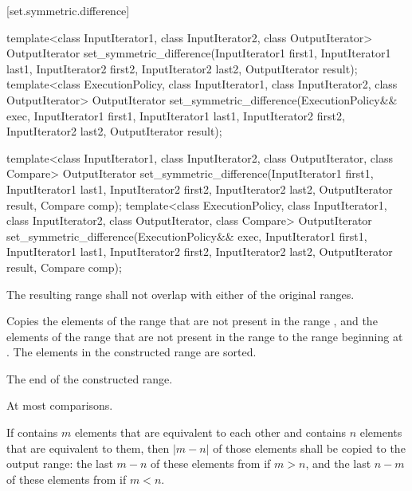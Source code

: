 [set.symmetric.difference]{}

%
\begin{itemdecl}
template<class InputIterator1, class InputIterator2,
         class OutputIterator>
  OutputIterator
    set_symmetric_difference(InputIterator1 first1, InputIterator1 last1,
                             InputIterator2 first2, InputIterator2 last2,
                             OutputIterator result);
template<class ExecutionPolicy, class InputIterator1, class InputIterator2,
         class OutputIterator>
  OutputIterator
    set_symmetric_difference(ExecutionPolicy&& exec,
                             InputIterator1 first1, InputIterator1 last1,
                             InputIterator2 first2, InputIterator2 last2,
                             OutputIterator result);

template<class InputIterator1, class InputIterator2,
         class OutputIterator, class Compare>
  OutputIterator
    set_symmetric_difference(InputIterator1 first1, InputIterator1 last1,
                             InputIterator2 first2, InputIterator2 last2,
                             OutputIterator result, Compare comp);
template<class ExecutionPolicy, class InputIterator1, class InputIterator2,
         class OutputIterator, class Compare>
  OutputIterator
    set_symmetric_difference(ExecutionPolicy&& exec,
                             InputIterator1 first1, InputIterator1 last1,
                             InputIterator2 first2, InputIterator2 last2,
                             OutputIterator result, Compare comp);
\end{itemdecl}

\begin{itemdescr}
\pnum
\requires
The resulting range shall not overlap with either of the original ranges.

\pnum
\effects
Copies the elements of the range
that are not present in the range
,
and the elements of the range
that are not present in the range
to the range beginning at
.
The elements in the constructed range are sorted.

\pnum
\returns
The end of the constructed range.

\pnum
\complexity
At most
comparisons.

\pnum
\remarks
If  contains $m$ elements that are equivalent to each other and
 contains $n$ elements that are equivalent to them, then
$|m - n|$ of those elements shall be copied to the output range: the last
$m - n$ of these elements from  if $m > n$, and the last 
$n - m$ of these elements from  if $m < n$.
\end{itemdescr}


